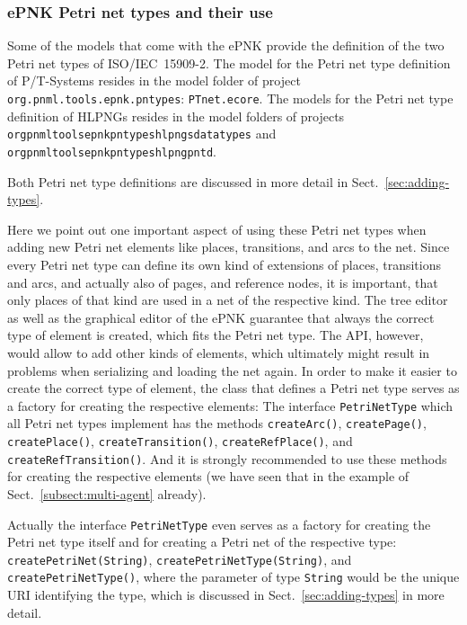 \subsubsection{ePNK Petri net types and their use}
\label{subsubsec:function:PNTD:use}

Some of the models that come with the ePNK provide the definition of the
two Petri net types of ISO/IEC~15909-2. The model for the Petri net type
definition of P/T-Systems resides in the model folder of
project {\tt org.pnml.tools.epnk.pntypes}: {\tt PTnet.ecore}.
The models for the Petri net type definition of HLPNGs resides in the
model folders of projects
{\tt org\qnsep{}pnml\qnsep{}tools\qnsep{}epnk\qnsep{}pntypes\qnsep{}hlpngs\qnsep{}datatypes} 
and {\tt org\qnsep{}pnml\qnsep{}tools\qnsep{}epnk\qnsep{}pntypes\qnsep{}hlpng\qnsep{}pntd}.

Both Petri net type definitions are discussed in more detail
in Sect.~\ref{sec:adding-types}.

Here we point out one important aspect of using these Petri net types
when adding new Petri net elements like places, transitions, and arcs
to the net. Since every Petri net type can define its own kind of
extensions of places, transitions and arcs, and actually also of
pages, and reference nodes, it is important, that only places of
that kind are used in a net of the respective kind. The tree editor as
well as the graphical editor of the ePNK guarantee that always the
correct type of element is created, which fits the Petri net type.
The API, however, would allow to add other kinds of elements,
which ultimately might result in problems when serializing and
loading the net again. In order to make it easier to create the
correct type of element, the class that defines a Petri net type
serves as a factory for creating the respective elements: The
interface {\tt PetriNetType} which all Petri net types implement
has the methods {\tt createArc()},  {\tt createPage()},  {\tt createPlace()},
 {\tt createTransition()},  {\tt createRefPlace()}, and  {\tt createRefTransition()}.
And it is strongly recommended to use these methods for creating
the respective elements (we have seen that in the example of
Sect.~\ref{subsect:multi-agent} already).

Actually the interface {\tt PetriNetType} even serves as a factory for creating
the Petri net type itself and for creating a Petri net of the respective type:
{\tt createPetriNet(String)},  {\tt createPetriNetType(String)}, and
{\tt createPetriNetType()}, where the parameter of type {\tt String} would be
the unique URI identifying the type,%
which is discussed in Sect.~\ref{sec:adding-types} in more detail.  
  
